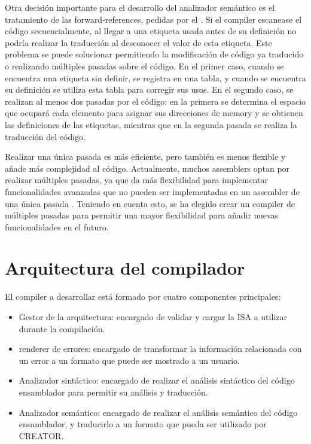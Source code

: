 Otra decisión importante para el desarrollo del analizador semántico es el
tratamiento de las \glspl{forward-reference}, pedidas por el
. Si el \gls{compiler} escanease el código
secuencialmente, al llegar a una etiqueta usada antes de su definición no podría
realizar la traducción al desconocer el valor de esta etiqueta. Este problema se
puede solucionar permitiendo la modificación de código ya traducido o realizando
múltiples pasadas sobre el código. En el primer caso, cuando se encuentra una
etiqueta sin definir, se registra en una tabla, y cuando se encuentra su
definición se utiliza esta tabla para corregir sus usos. En el segundo caso, se
realizan al menos dos pasadas por el código: en la primera se determina el
espacio que ocupará cada elemento para asignar sus direcciones de \gls{memory} y
se obtienen las definiciones de las etiquetas, mientras que en la segunda pasada
se realiza la traducción del código. \parencite{assembler-design}

Realizar una única pasada es más eficiente, pero también es menos flexible y
añade más complejidad al código. Actualmente, muchos \glspl{assembler} optan por
realizar múltiples pasadas, ya que da más flexibilidad para implementar
funcionalidades avanzadas que no pueden ser implementadas en un \gls{assembler}
de una única pasada \parencite{assembler-design}. Teniendo en cuenta esto, se ha
elegido crear un \gls{compiler} de múltiples pasadas para permitir una mayor
flexibilidad para añadir nuevas funcionalidades en el futuro.

\section{Arquitectura del compilador}\label{sec:architecture}

\noindent
El \gls{compiler} a desarrollar está formado por cuatro componentes principales:

\begin{itemize}
    \item Gestor de la arquitectura: encargado de validar y cargar la \gls{ISA}
    a utilizar durante la compilación.
    \item \Gls{renderer} de errores: encargado de transformar la información
    relacionada con un error a un formato que puede ser mostrado a un usuario.
    \item Analizador sintáctico: encargado de realizar el análisis sintáctico del
    código ensamblador para permitir su análisis y traducción.
    \item Analizador semántico: encargado de realizar el análisis semántico del
    código ensamblador, y traducirlo a un formato que pueda ser utilizado por
    CREATOR.
\end{itemize}


